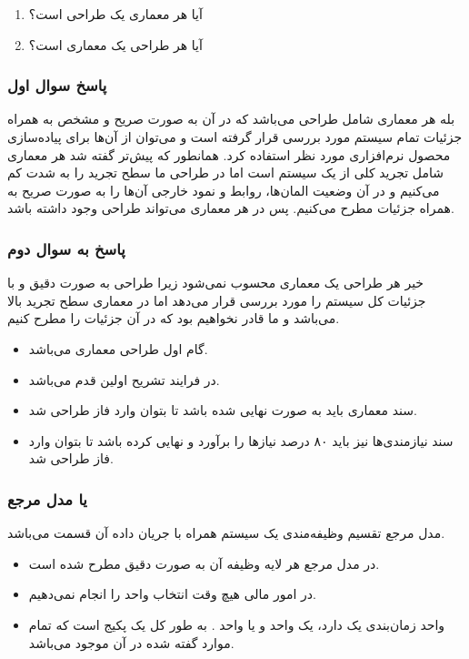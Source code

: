 \begin{enumerate}
    \item آیا هر معماری یک طراحی است؟
    \item آیا هر طراحی یک معماری است؟
\end{enumerate}

\subsubsection*{پاسخ سوال اول}

بله هر معماری شامل طراحی می‌باشد که در آن به صورت صریح و مشخص به همراه جزئیات
تمام سیستم مورد بررسی قرار گرفته است و می‌توان از آن‌ها برای پیاده‌سازی محصول
نرم‌افزاری مورد نظر استفاده کرد. همانطور که پیش‌تر گفته شد هر معماری شامل تجرید
کلی از یک سیستم است اما در طراحی ما سطح تجرید را به شدت کم می‌کنیم و در آن وضعیت
المان‌ها، روابط و نمود خارجی آن‌ها را به صورت صریح به همراه جزئیات مطرح می‌کنیم.
پس در هر معماری می‌تواند طراحی وجود داشته باشد.

\subsubsection*{پاسخ به سوال دوم}

خیر هر طراحی یک معماری محسوب نمی‌شود زیرا طراحی به صورت دقیق و با جزئیات کل
سیستم را مورد بررسی قرار می‌دهد اما در معماری سطح تجرید بالا می‌باشد و ما قادر
نخواهیم بود که در آن جزئیات را مطرح کنیم.

\begin{itemize}
    \item گام اول طراحی معماری می‌باشد.
    \item در  فرایند تشریح اولین قدم می‌باشد.
    \item سند معماری باید به صورت نهایی شده باشد تا بتوان وارد فاز طراحی شد.
    \item سند نیازمندی‌ها نیز باید ۸۰ درصد نیاز‌ها را برآورد و نهایی کرده باشد
    تا بتوان وارد فاز طراحی شد.
\end{itemize}

\subsubsection{ یا مدل مرجع}

مدل مرجع تقسیم وظیفه‌مندی یک سیستم همراه با جریان داده آن قسمت می‌باشد.

\begin{itemize}
    \item در مدل مرجع  هر لایه وظیفه آن به صورت دقیق مطرح شده است.
    \item در امور مالی هیچ وقت انتخاب واحد را انجام نمی‌دهیم.
    \item واحد زمان‌بندی یک  دارد، یک واحد  و یا واحد
    . به طور کل یک پکیج است که تمام موارد گفته شده در آن موجود
    می‌باشد.
\end{itemize}

